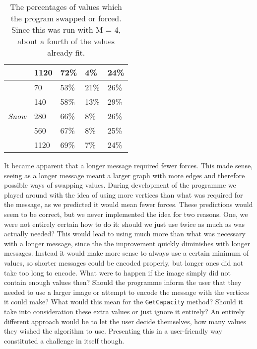 \begin{table}[]
\begin{tabular}{@{}lllll@{}}
                                    & 1120                    & 72\%           & 4\%             & 24\%                 \\ \midrule
\multirow{5}{*}{\textit{Snow}}      & 70                      & 53\%           & 21\%            & 26\%                 \\
                                    & 140                     & 58\%           & 13\%            & 29\%                 \\
                                    & 280                     & 66\%           & 8\%             & 26\%                 \\
                                    & 560                     & 67\%           & 8\%             & 25\%                 \\
                                    & 1120                    & 69\%           & 7\%             & 24\%                 \\ \bottomrule
\end{tabular}
	\caption{The percentages of values which the program swapped or forced. Since this was run with M = 4, about a fourth of the values already fit.}
	\label{fig:forces_swaps}
\end{table}

It became apparent that a longer message required fewer forces. 
This made sense, seeing as a longer message meant a larger graph with more edges and therefore possible ways of swapping values.
During development of the programme we played around with the idea of using more vertices than what was required for the message, as we predicted it would mean fewer forces.
These predictions would seem to be correct, but we never implemented the idea for two reasons.
One, we were not entirely certain how to do it: should we just use twice as much as was actually needed?
This would lead to using much more than what was necessary with a longer message, since the the improvement quickly diminishes with longer messages.
Instead it would make more sense to always use a certain minimum of values, so shorter messages could be encoded properly, but longer ones did not take too long to encode.
What were to happen if the image simply did not contain enough values then? 
Should the programme inform the user that they needed to use a larger image or attempt to encode the message with the vertices it could make?
What would this mean for the \lstinline|GetCapacity| method? 
Should it take into consideration these extra values or just ignore it entirely?
An entirely different approach would be to let the user decide themselves, how many values they wished the algorithm to use. 
Presenting this in a user-friendly way constituted a challenge in itself though.

